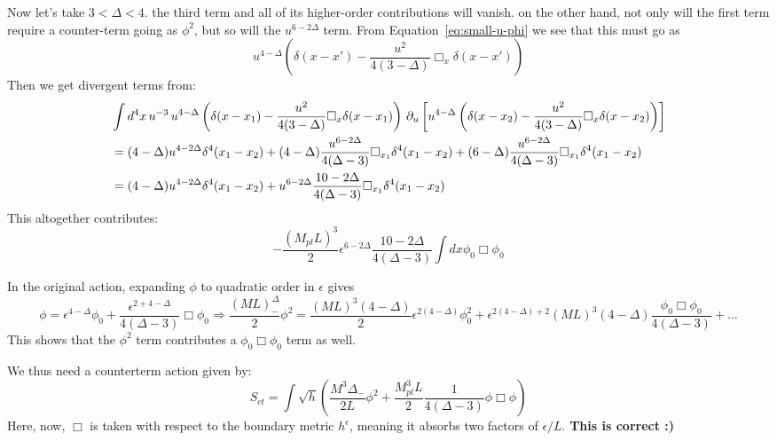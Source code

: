 \documentclass[11pt, class=article, crop=false]{standalone}
\begin{document}
\begin{enumerate}
	Now let's take $3 < \Delta < 4$. the third term and all of its higher-order contributions will vanish. on the other hand, not only will the first term require a counter-term going as $\phi^2$, but so will the $u^{6-2 \Delta}$ term. From Equation~\eqref{eq:small-u-phi} we see that this must go as 
	\[
		u^{4-\Delta}(\delta(x-x') - \frac{u^2}{4 (3- \Delta)} \Box_x \delta(x- x') )
	\]
	Then we get divergent terms from:
	\[
	\begin{aligned}
		&\int d^4 x \, u^{-3} \, u^{4-\Delta}\left(\delta(x-x_1) - \frac{u^2}{4 (3- \Delta)} \Box_x \delta(x- x_1) \right) \, \partial_u \left[
		u^{4-\Delta} \left(\delta(x-x_2) - \frac{u^2}{4 (3- \Delta)} \Box_x \delta(x- x_2) \right) \right]\\
		&= (4-\Delta) u^{4-2\Delta} \delta^4 (x_1 - x_2) + (4-\Delta) \frac{u^{6-2\Delta}}{4 (\Delta-3)} \Box_{x_1} \delta^4 (x_1 - x_2) + (6-\Delta) \frac{u^{6-2\Delta}}{4 (\Delta-3)} \Box_{x_1} \delta^4 (x_1 - x_2)\\
		&= (4-\Delta) u^{4-2\Delta} \delta^4 (x_1 - x_2) +  u^{6-2\Delta} \frac{10-2\Delta}{4 (\Delta-3)} \Box_{x_1} \delta^4 (x_1 - x_2)
	\end{aligned}
	\]
	This altogether contributes:
	\[
		- \frac{(M_{pl} L)^3}{2} \epsilon^{6-2\Delta} \frac{10-2\Delta}{4 (\Delta-3)} \int dx \phi_0 \Box \phi_0
	\]
	
	In the original action, expanding $\phi$ to quadratic order in $\epsilon$ gives
	\[
		\phi = \epsilon^{4-\Delta} \phi_0 + \frac{\epsilon^{2 + 4 - \Delta}}{4 (\Delta - 3)} \Box \phi_0 \Rightarrow \frac{(ML)^ \Delta_{-}}{2} \phi^2 =   \frac{(ML)^3 (4- \Delta)}{2} \epsilon^{2 (4- \Delta)} \phi_0^2  + \epsilon^{2 (4 - \Delta) + 2} (ML)^3 (4-\Delta) \frac{\phi_0 \Box \phi_0}{4 (\Delta - 3)} + \dots
	\]
	This shows that the $\phi^2$ term contributes a $\phi_0 \Box \phi_0$ term as well. 
	
	We thus need a counterterm action given by:
	\[
		S_{ct} = \int \sqrt{h} \left( \frac{M^3 \Delta_-}{2L} \phi^2 + \frac{M_{pl}^3 L}{2} \frac{1}{4 (\Delta - 3)} \phi \Box \phi \right)%
	\]
	Here, now, $\Box$ is taken with respect to the boundary metric $h^\epsilon$, meaning it absorbs two factors of $\epsilon/L$. \textbf{This is correct :)}
	

\end{enumerate}
\end{document}
